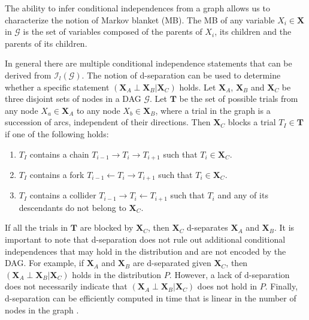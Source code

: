 The ability to infer conditional independences from a graph allows us to characterize the notion of Markov blanket (MB). The MB of any variable $X_{i} \in \mathbf{X}$ in $\mathcal{G}$ is the set of variables composed of the parents of $X_{i}$, its children and the parents of its children.

In general there are multiple conditional independence statements that can be derived from $\mathcal{I}_{l}(\mathcal{G})$. The notion of d-separation can be used to determine whether a specific statement $(\mathbf{X}_{A} \perp \mathbf{X}_{B} | \mathbf{X}_{C})$ holds. Let $\mathbf{X}_{A}$, $\mathbf{X}_{B}$ and $\mathbf{X}_{C}$ be three disjoint sets of nodes in a DAG $\mathcal{G}$. Let $\mathbf{T}$ be the set of possible trials from any node $X_{a} \in \mathbf{X}_{A}$ to any node $X_{b} \in \mathbf{X}_{B}$, where a trial in the graph is a succession of arcs, independent of their directions. Then $\mathbf{X}_{C}$ blocks a trial $T_{I} \in \mathbf{T}$ if one of the following holds:
\begin{enumerate}
	\item $T_{I}$ contains a chain $T_{i-1} \rightarrow T_{i} \rightarrow T_{i+1}$ such that $T_{i} \in \mathbf{X}_{C}$.
	\item $T_{I}$ contains a fork $T_{i-1} \leftarrow T_{i} \rightarrow T_{i+1}$ such that $T_{i} \in \mathbf{X}_{C}$.
	\item $T_{I}$ contains a collider $T_{i-1} \rightarrow T_{i} \leftarrow T_{i+1}$ such that $T_{i}$ and any of its descendants do not belong to $\mathbf{X}_{C}$.
\end{enumerate}

If all the trials in $\mathbf{T}$ are blocked by $\mathbf{X}_{C}$, then $\mathbf{X}_{C}$ d-separates $\mathbf{X}_{A}$ and $\mathbf{X}_{B}$. It is important to note that d-separation does not rule out additional conditional independences that may hold in the distribution and are not encoded by the DAG. For example, if $\mathbf{X}_{A}$ and $\mathbf{X}_{B}$ are d-separated given $\mathbf{X}_{C}$, then $(\mathbf{X}_{A} \perp \mathbf{X}_{B} | \mathbf{X}_{C})$ holds in the distribution $P$. However, a lack of d-separation does not necessarily indicate that $(\mathbf{X}_{A} \perp \mathbf{X}_{B} | \mathbf{X}_{C})$ does not hold in $P$. Finally, d-separation can be efficiently computed in time that is linear in the number of nodes in the graph \citep{geiger1990}.


